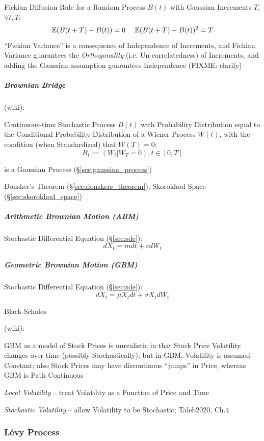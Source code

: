 Fickian Diffusion Rule for a Random Process $B(t)$ with Gaussian Increments $T$,
$\forall t, T$:
\[
  \expect(B(t+T) - B(t)) = 0 \ \ \ \ \expect(B(t+T) - B(t))^2 = T
\]
``Fickian Variance'' is a consequence of Independence of Increments, and Fickian
Variance guarantees the \emph{Orthogonality} (i.e. Un-correlatedness) of
Increments, and adding the Gaussian assumption guarantees Independence (FIXME:
clarify)



\subparagraph{Brownian Bridge}\label{sec:brownian_bridge}\hfill

(wiki):

Continuous-time Stochastic Process $B(t)$ with Probability Distribution equal to
the Conditional Probability Distribution of a Wiener Process $W(t)$, with the
condition (when Standardized) that $W(T) = 0$:
\[
  B_t := (W_t | W_T = 0), t \in [0,T]
\]

is a Gaussian Process (\S\ref{sec:gaussian_process})

\fist Donsker's Theorem (\S\ref{sec:donskers_theorem}), Skorokhod Space
(\S\ref{sec:skorokhod_space})



\subparagraph{Arithmetic Brownian Motion (ABM)}\label{sec:abm}\hfill

Stochastic Differential Equation (\S\ref{sec:sde}):
\[
  dX_t = m dt + v dW_t
\]



\subparagraph{Geometric Brownian Motion (GBM)}\label{sec:gbm}\hfill

Stochastic Differential Equation (\S\ref{sec:sde}):
\[
  dX_t = \mu X_t dt + \sigma X_t dW_t
\]

Black-Scholes

(wiki):

GBM as a model of Stock Prices is unrealistic in that Stock Price Volatility
changes over time (possibly Stochastically), but in GBM, Volatility is assumed
Constant; also Stock Prices may have discontinous ``jumps'' in Price, whereas
GBM is Path Continuous

\emph{Local Volatility} -- treat Volatility as a Function of Price and Time

\emph{Stochastic Volatility} -- allow Volatility to be Stochastic;
Taleb2020, Ch.4



\subsubsection{L\'evy Process}\label{sec:levy_process}

